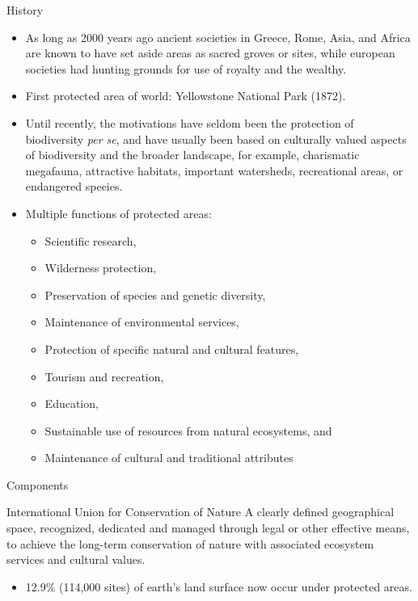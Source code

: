\documentclass[
  ignorenonframetext,
  aspectratio=169]{beamer}
\providecommand{\tightlist}{%
  \setlength{\itemsep}{0pt}\setlength{\parskip}{0pt}}
\begin{document}
\begin{frame}{History}
\protect\hypertarget{history}{}
\footnotesize

\begin{itemize}
\tightlist
\item
  As long as 2000 years ago ancient societies in Greece, Rome, Asia, and
  Africa are known to have set aside areas as sacred groves or sites,
  while european societies had hunting grounds for use of royalty and
  the wealthy.
\item
  First protected area of world: Yellowstone National Park (1872).
\item
  Until recently, the motivations have seldom been the protection of
  biodiversity \emph{per se}, and have usually been based on culturally
  valued aspects of biodiversity and the broader landscape, for example,
  charismatic megafauna, attractive habitats, important watersheds,
  recreational areas, or endangered species.
\item
  Multiple functions of protected areas:

  \begin{itemize}
  \tightlist
  \item
    Scientific research,
  \item
    Wilderness protection,
  \item
    Preservation of species and genetic diversity,
  \item
    Maintenance of environmental services,
  \item
    Protection of specific natural and cultural features,
  \item
    Tourism and recreation,
  \item
    Education,
  \item
    Sustainable use of resources from natural ecosystems, and
  \item
    Maintenance of cultural and traditional attributes
  \end{itemize}
\end{itemize}
\end{frame}

\begin{frame}{Components}
\protect\hypertarget{components}{}
\begin{block}{International Union for Conservation of Nature}
A clearly defined geographical space, recognized, dedicated and managed through legal or other effective means, to achieve the long-term conservation of nature with associated ecosystem services and cultural values.
\end{block}

\begin{itemize}
\tightlist
\item
  12.9\% (114,000 sites) of earth's land surface now occur under
  protected areas.
\end{itemize}
\end{frame}
\end{document}
